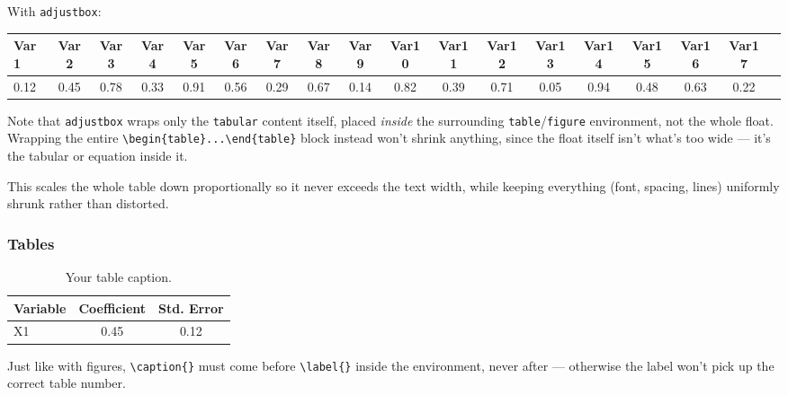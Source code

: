 \bigskip

With \texttt{adjustbox}: 

\begin{table}[H]
\begin{adjustbox}{max width=\textwidth}
\centering
\begin{tabular}{lccccccccccccccccc}
    \toprule
    Var1 & Var2 & Var3 & Var4 & Var5 & Var6 & Var7 & Var8 & Var9 & Var10 & Var11 & Var12 & Var13 & Var14 & Var15 & Var16 & Var17 \\
    \midrule
    0.12 & 0.45 & 0.78 & 0.33 & 0.91 & 0.56 & 0.29 & 0.67 & 0.14 & 0.82 & 0.39 & 0.71 & 0.05 & 0.94 & 0.48 & 0.63 & 0.22 \\
    \bottomrule
\end{tabular}
\end{adjustbox}
\end{table}

Note that \texttt{adjustbox} wraps only the \texttt{tabular} content itself, placed \emph{inside} the surrounding \texttt{table}/\texttt{figure} environment, not the whole float. Wrapping the entire \verb|\begin{table}...\end{table}| block instead won't shrink anything, since the float itself isn't what's too wide --- it's the tabular or equation inside it.

This scales the whole table down proportionally so it never exceeds the text width, while keeping everything (font, spacing, lines) uniformly shrunk rather than distorted. 

\subsubsection*{Tables}

\begin{table}[H]
    \centering
    \begin{tabular}{lcc}
        \toprule
        Variable & Coefficient & Std. Error \\
        \midrule
        X1 & 0.45 & 0.12 \\
        \bottomrule
    \end{tabular}
    \caption{Your table caption.}
    \label{tab:mylabel}
\end{table}

Just like with figures, \verb|\caption{}| must come before \verb|\label{}| inside the environment, never after --- otherwise the label won't pick up the correct table number. 

